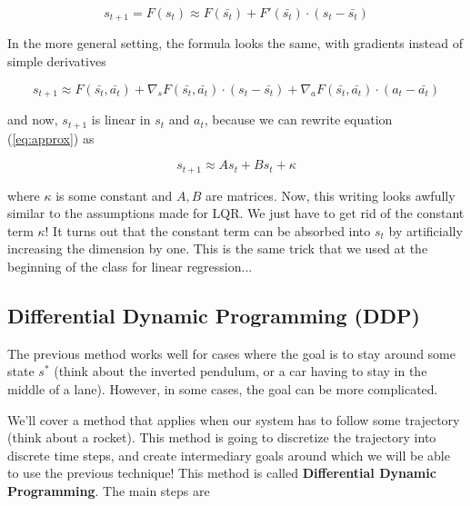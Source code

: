 \documentclass{article}
\begin{document}
\[ s_{t+1} = F(s_t) \approx F(\bar{s_t}) + F'(\bar{s_t}) \cdot (s_t - \bar{s_t})\]

In the more general setting, the formula looks the same, with gradients instead of simple derivatives


\begin{equation}
\label{eq:approx}
 s_{t+1} \approx F(\bar{s_t}, \bar{a_t}) + \nabla_s F(\bar{s_t}, \bar{a_t}) \cdot (s_t - \bar{s_t}) +  \nabla_a F(\bar{s_t}, \bar{a_t}) \cdot (a_t - \bar{a_t}) 
\end{equation}



and now, $ s_{t+1} $ is linear in $ s_t $ and $ a_t $, because we can rewrite equation (\ref{eq:approx}) as

\[ s_{t+1} \approx A s_t + B s_t + \kappa \]

where $ \kappa $ is some constant and $ A, B $  are matrices. Now, this writing looks awfully similar to the assumptions made for LQR. We just have to get rid of the constant term $ \kappa $! It turns out that the constant term can be absorbed into $ s_t $ by artificially increasing the dimension by one. This is the same trick that we used at the beginning of the class for linear regression...

\subsection{Differential Dynamic Programming (DDP)}

The previous method works well for cases where the goal is to stay around some state $ s^* $ (think about the inverted pendulum, or a car having to stay in the middle of a lane). However, in some cases, the goal can be more complicated.

We'll cover a method that applies when our system has to follow some trajectory (think about a rocket). This method is going to discretize the trajectory into discrete time steps, and create intermediary goals around which we will be able to use the previous technique! This method is called \textbf{Differential Dynamic Programming}. The main steps are
\end{document}
